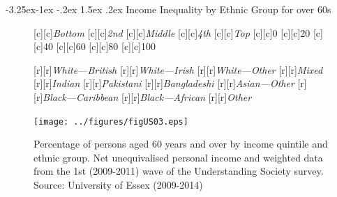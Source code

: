 \documentclass[11 pt, a4paper]{report}
\makeatletter
\renewcommand\subsection{\@startsection{subsection}{2}{\z@}%
                                     {-3.25ex\@plus -1ex \@minus -.2ex}%
                                     {1.5ex \@plus .2ex}%
    								{\large\scshape}}
\makeatother
\begin{document}
\subsection{Income Inequality by Ethnic Group for over 60s}
\begin{figure}[hbtp!]
[c][c]{\small{\emph{Bottom}}}
[c][c]{\small{\emph{2nd}}}
[c][c]{\small{\emph{Middle}}}
[c][c]{\small{\emph{4th}}}
[c][c]{\small{\emph{Top}}}
[c][c]{\small{0}}
[c][c]{\small{20}}
[c][c]{\small{40}}
[c][c]{\small{60}}
[c][c]{\small{80}}
[c][c]{\small{100}}


[r][r]{\small{\emph{White---British}}}
[r][r]{\small{\emph{White---Irish}}}
[r][r]{\small{\emph{White---Other}}}
[r][r]{\small{\emph{Mixed}}}
[r][r]{\small{\emph{Indian}}}
[r][r]{\small{\emph{Pakistani}}}
[r][r]{\small{\emph{Bangladeshi}}}
[r][r]{\small{\emph{Asian---Other}}}
[r][r]{\small{\emph{Black---Caribbean}}}
[r][r]{\small{\emph{Black---African}}}
[r][r]{\small{\emph{Other}}}



\texttt{[image: ../figures/figUS03.eps]}
\caption{Percentage of persons aged 60 years and over by income quintile and ethnic group. Net unequivalised personal income and weighted data from the 1st (2009-2011) wave of the Understanding Society  survey. Source: University of Essex (2009-2014) }\label{Fig:US03} %
\end{figure}
\end{document}

